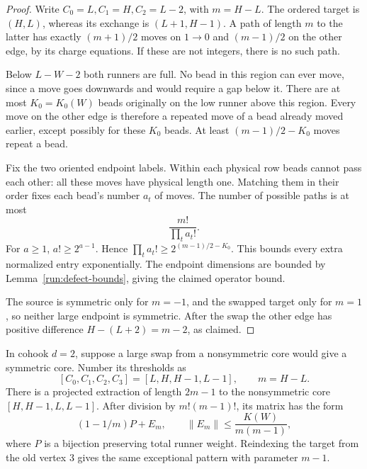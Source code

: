 \begin{proof}
Write \(C_0=L,C_1=H,C_2=L-2\), with \(m=H-L\).
The ordered target is \((H,L)\), whereas its exchange is
\((L+1,H-1)\).  A path of length \(m\) to the latter has
exactly \((m+1)/2\) moves on \(1\to0\) and \((m-1)/2\)
on the other edge, by its charge equations.  If these are not
integers, there is no such path.

Below \(L-W-2\) both runners are full.  No bead in this region
can ever move, since a move goes downwards and would require
a gap below it.  There are at most \(K_0=K_0(W)\) beads
originally on the low runner above this region.  Every move
on the other edge is therefore a repeated move of a bead
already moved earlier, except possibly for these \(K_0\)
beads.  At least \((m-1)/2-K_0\) moves repeat a bead.

Fix the two oriented endpoint labels.  Within each physical
row beads cannot pass each other: all these moves have
physical length one.  Matching them in their order fixes
each bead's number \(a_t\) of moves.  The number of possible
paths is at most
\[
 \frac{m!}{\prod_t a_t!}.
 \]
For \(a\geq1\), \(a!\geq2^{a-1}\).  Hence
\(\prod_ta_t!\geq2^{(m-1)/2-K_0}\).
This bounds every extra normalized entry exponentially.
The endpoint dimensions are bounded by
Lemma~\ref{run:defect-bounds}, giving the claimed operator
bound.

The source is symmetric only for \(m=-1\), and the swapped
target only for \(m=1\), so neither large endpoint is symmetric.
After the swap the other edge has
positive difference \(H-(L+2)=m-2\), as claimed.
\end{proof}

\begin{lemma}\label{run:d-two}
In cohook \(d=2\), suppose a large swap from a nonsymmetric
core would give a symmetric core.  Number its thresholds as
\[
 [C_0,C_1,C_2,C_3]=[L,H,H-1,L-1],\qquad m=H-L.
 \]
There is a projected extraction of length \(2m-1\) to the
nonsymmetric core
\([H,H-1,L,L-1]\).
After division by \(m!(m-1)!\), its matrix has the form
\[
 (1-1/m)P+E_m,\qquad
 \|E_m\|\leq \frac{K(W)}{m(m-1)},
 \]
where \(P\) is a bijection preserving total runner weight.
Reindexing the target from the old vertex \(3\) gives the
same exceptional pattern with parameter \(m-1\).
\end{lemma}

